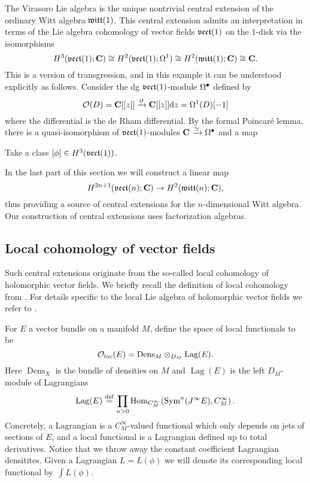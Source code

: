 \documentclass[11pt]{amsart}
\renewcommand{\op}{\operatorname}
\begin{document}
The Virasoro Lie algebra is the unique nontrivial central extension of the ordinary Witt algebra $\mathfrak{witt}(1)$.
This central extension admits an interpretation in terms of the Lie algebra cohomology of  vector fields $\mathfrak{vect}(1)$ on the $1$-disk via the isomorphisms
\begin{equation}
H^3(\mathfrak{vect}(1); \mathbf{C}) \cong H^2(\mathfrak{vect}(1); \Omega^1) \cong H^2(\mathfrak{witt}(1);\mathbf{C}) \cong \mathbf{C} .
\end{equation}
This is a version of transgression, and in this example it can be understood explicitly as follows.
Consider the dg $\mathfrak{vect}(1)$-module $\Omega^{\bullet}$ defined by
\begin{equation}\label{}
  \mathcal O(D) = \mathbf{C}[[z]] \xrightarrow{\partial} \mathbf{C}[[z]] {\rm d} z = \Omega^{1}(D) [-1]
\end{equation}
where the differential is the de Rham differential.
By the formal Poincar\'{e} lemma, there is a quasi-isomorphism of $\mathfrak{vect}(1)$-modules $\mathbf{C} \xrightarrow{\simeq} \Omega^{\bullet}$ and a map 

Take a class $[\phi] \in H^{3}(\mathfrak{vect}(1))$.


In the last part of this section we will construct a linear map
\begin{equation}
H^{2n+1}(\mathfrak{vect}(n);\mathbf{C}) \to H^2(\mathfrak{witt}(n);\mathbf{C}), 
\end{equation}
thus providing a source of central extensions for the $n$-dimensional Witt algebra.
Our construction of central extensions uses factorization algebras.

\subsection{Local cohomology of vector fields}

Such central extensions originate from the so-called local cohomology of holomorphic vector fields.
We briefly recall the definition of local cohomology from \cite{CG2}.
For details specific to the local Lie algebra of holomorphic vector fields we refer to \cite{BWgf}.

For $E$ a vector bundle on a manifold $M$, define the space of local functionals to be 
\begin{equation}
{\mathcal O}_{loc}(E) = {\rm Dens}_M \otimes_{D_M} {\rm Lag} (E) .
\end{equation}
Here $\op{Dens}_X$ is the bundle of densities on $M$ and $\op{Lag}(E)$ is the left $D_M$-module of Lagrangians
\begin{equation}
\op{Lag} (E) \define \prod_{n > 0} {\rm Hom}_{C^\infty_M} \left( \Sym^n(J^\infty E) , C^\infty_M\right) .
\end{equation}
Concretely, a Lagrangian is a $C^\infty_M$-valued functional which only depends on jets of sections of $E$, and a local functional is a Lagrangian defined up to total derivatives.
Notice that we throw away the constant coefficient Lagrangian densitites.
Given a Lagrangian $L = L(\phi)$ we will denote its corresponding local functional by~$\int L(\phi)$.
\end{document}
